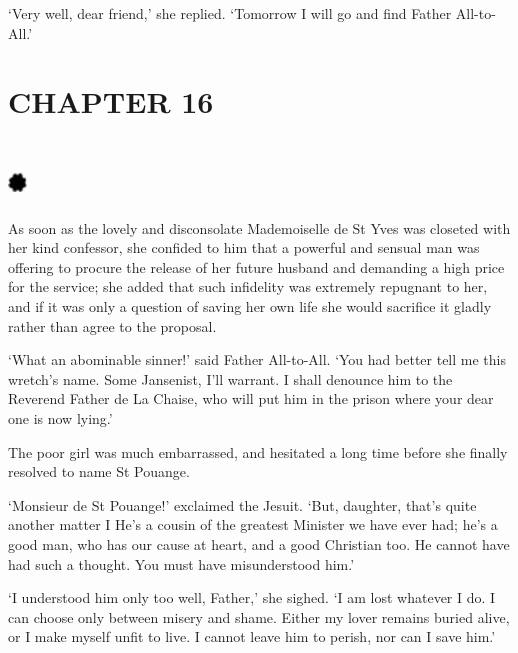 \documentclass{article}
\begin{document}
\begin{center}
`Very well, dear friend,' she replied. `Tomorrow I will go and find Father All-to-All.'\pagebreak{} 

\section*{\textbf{CHAPTER 16  }}

\section*{%
\includegraphics[width=14pt, height=15pt, keepaspectratio=true]{Zadig or L'Ingenu - Voltaire-fig038.jpg}
}

 

As soon as the lovely and disconsolate Mademoiselle de St Yves was closeted with 
her kind confessor, she confided to him that a powerful and sensual man was offering 
to procure the release of her future husband and demanding a high price for the 
service; she added that such infidelity was extremely repugnant to her, and if 
it was only a question of saving her own life she would sacrifice it gladly rather 
than agree to the proposal. 

`What an abominable sinner!' said Father All-to-All. `You had better tell me this 
wretch's name. Some Jansenist, I'll warrant. I shall denounce him to the Reverend 
Father de La Chaise, who will put him in the prison where your dear one is now 
lying.' 

The poor girl was much embarrassed, and hesitated a long time before she finally 
resolved to name St Pouange. 

`Monsieur de St Pouange!' exclaimed the Jesuit. `But, daughter, that's quite another 
matter I He's a cousin of the greatest Minister we have ever had; he's a good man, 
who has our cause at heart, and a good Christian too. He cannot have had such a 
thought. You must have misunderstood him.' 

`I understood him only too well, Father,' she sighed. `I am lost whatever I do. 
I can choose only between misery and shame. Either my lover remains buried alive, 
or I make myself unfit to live. I cannot leave him to perish, nor can I save him.' 


\end{center}
\end{document}
